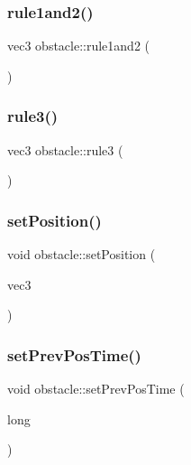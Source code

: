 \mbox{\label{classobstacle_a7f0520183cb9c8a7edfe977cc7e7cca9}} 
\subsubsection{\texorpdfstring{rule1and2()}{rule1and2()}}
{\footnotesize\ttfamily vec3 obstacle\+::rule1and2 (\begin{DoxyParamCaption}{ }\end{DoxyParamCaption})}

\mbox{\label{classobstacle_abc29860de93b1d83dd80f98f70b19554}} 
\subsubsection{\texorpdfstring{rule3()}{rule3()}}
{\footnotesize\ttfamily vec3 obstacle\+::rule3 (\begin{DoxyParamCaption}{ }\end{DoxyParamCaption})}

\mbox{\label{classobstacle_ac32e907563b7f824f07a41fe665a899c}} 
\subsubsection{\texorpdfstring{set\+Position()}{setPosition()}}
{\footnotesize\ttfamily void obstacle\+::set\+Position (\begin{DoxyParamCaption}\item[{vec3}]{ }\end{DoxyParamCaption})}

\mbox{\label{classobstacle_acda53aa0ed77badcbf9198b6537c2ecc}} 
\subsubsection{\texorpdfstring{set\+Prev\+Pos\+Time()}{setPrevPosTime()}}
{\footnotesize\ttfamily void obstacle\+::set\+Prev\+Pos\+Time (\begin{DoxyParamCaption}\item[{long}]{ }\end{DoxyParamCaption})}

